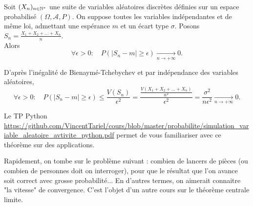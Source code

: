 \documentclass{book}
\begin{document}
\begin{Theoreme}
Soit $(X_n)_{n\in\mathbb{N}^*}$ une suite de variables aléatoires discrètes définies sur un espace probabilisé $(\Omega,\mathcal{A} ,P)$. On
suppose toutes les variables indépendantes et de même loi, admettant une espérance $m$ et un écart
type $\sigma$. Posons $S_n =\frac{X_1+X_2+\dots+X_n}{n}.$\\
Alors 
$$ \forall \epsilon>0: \quad P\left(\left| S_n - m \right|\geq \epsilon \right )\xrightarrow[n\to+\infty]{}0.$$
\end{Theoreme}
\begin{Demonstration}
D'après l'inégalité de Bienaymé-Tchebychev et par indépendance des variables aléatoires,
$$ \forall \epsilon>0: \quad P\left(\left| S_n - m \right|\geq \epsilon\right)\leq \frac{V(S_n)}{\epsilon^2}=\frac{\frac{V(X_1+X_2+\dots+X_n)}{n^2}}{\epsilon^2}=\frac{\sigma^2}{n\epsilon^2} \xrightarrow[n\to+\infty]{}0.$$
\end{Demonstration}
\begin{Remarque}
Le TP Python \url{https://github.com/VincentTariel/cours/blob/master/probabilite/simulation_variable_aleatoire_avtivite_python.pdf} permet de vous familiariser avec ce théorème sur des applications.
\end{Remarque}
Rapidement, on tombe sur le problème suivant : combien de
lancers de pièces (ou combien de personnes doit on
interroger), pour que le résultat que l'on avance soit correct
avec grosse probabilité... En d'autres termes, on aimerait connaitre "la vitesse" de
convergence. C'est l'objet d'un autre cours sur le théorème centrale limite.
\end{document}

